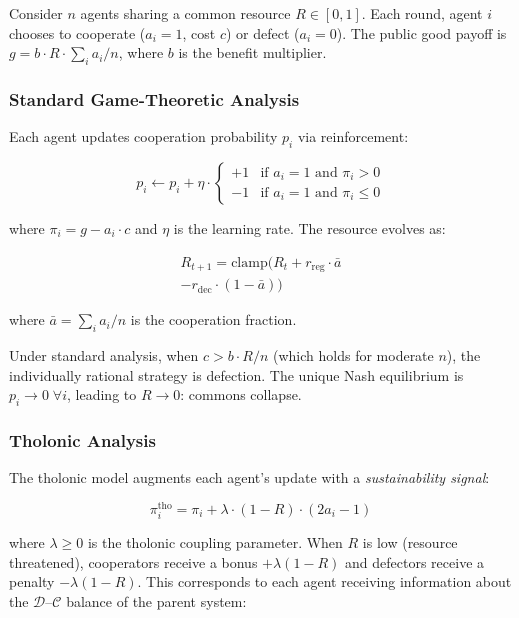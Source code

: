 \documentclass[12pt,a4paper,twocolumn]{article}
\newcommand{\D}{\mathcal{D}}
\newcommand{\CC}{\mathcal{C}}
\begin{document}
Consider $n$ agents sharing a common resource $R \in [0, 1]$.
Each round, agent $i$ chooses to cooperate ($a_i = 1$, cost $c$) or defect ($a_i = 0$).
The public good payoff is $g = b \cdot R \cdot \sum_i a_i / n$, where $b$ is the benefit multiplier.

\subsubsection{Standard Game-Theoretic Analysis}

Each agent updates cooperation probability $p_i$ via reinforcement:

\begin{equation}
\label{eq:standard_update}
p_i \leftarrow p_i + \eta \cdot \begin{cases} +1 & \text{if } a_i = 1 \text{ and } \pi_i > 0 \\ -1 & \text{if } a_i = 1 \text{ and } \pi_i \leq 0 \end{cases}
\end{equation}

where $\pi_i = g - a_i \cdot c$ and $\eta$ is the learning rate.
The resource evolves as:

\begin{multline}
R_{t+1} = \mathrm{clamp}\!\bigl(R_t + r_{\mathrm{reg}} \cdot \bar{a} \\
  - r_{\mathrm{dec}} \cdot (1 - \bar{a})\bigr)
\end{multline}

where $\bar{a} = \sum_i a_i / n$ is the cooperation fraction.

Under standard analysis, when $c > b \cdot R / n$ (which holds for moderate $n$), the individually rational strategy is defection.
The unique Nash equilibrium is $p_i \to 0 \;\forall i$, leading to $R \to 0$: commons collapse.

\subsubsection{Tholonic Analysis}

The tholonic model augments each agent's update with a \emph{sustainability signal}:

\begin{equation}
\label{eq:tholonic_update}
\pi_i^{\mathrm{tho}} = \pi_i + \lambda \cdot (1 - R) \cdot (2a_i - 1)
\end{equation}

where $\lambda \geq 0$ is the tholonic coupling parameter.
When $R$ is low (resource threatened), cooperators receive a bonus $+\lambda(1-R)$ and defectors receive a penalty $-\lambda(1-R)$.
This corresponds to each agent receiving information about the $\D$--$\CC$ balance of the parent system:
\end{document}
